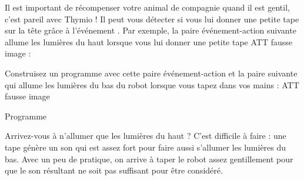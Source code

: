 

\newpage


Il est important de récompenser votre animal de compagnie quand il est gentil, c'est pareil avec Thymio !
Il peut vous détecter si vous lui donner une petite tape sur la tête grâce à l'événement .
Par exemple, la paire événement-action suivante allume les lumières du haut lorsque vous lui donner une petite tape ATT fausse image : 

Construisez un programme avec cette paire événement-action et la paire suivante qui allume les lumières du bas du robot lorsque vous tapez dans vos mains : ATT fausse image 

{\raggedleft \hfill Programme }

Arrivez-vous à n'allumer que les lumières du haut ?
C'est difficile à faire : une tape génère un son qui est assez fort pour faire aussi s'allumer les lumières du bas.
Avec un peu de pratique, on arrive à taper le robot assez gentillement pour que le son résultant ne soit pas suffisant pour être considéré.

